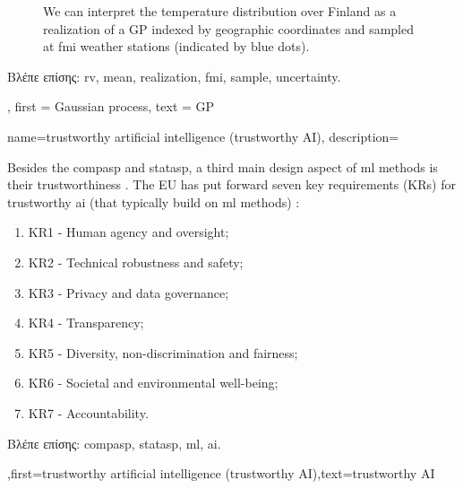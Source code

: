 {{\begin{figure}[H]
\begin{center}
\vspace*{-15mm}
\end{center}
\caption{We can interpret the temperature distribution over Finland as a \gls{realization} 
	of a GP indexed by geographic coordinates and sampled at \gls{fmi} weather stations (indicated by 
	blue dots). \label{fig_gp_FMI}}
\end{figure}
\foreignlanguage{greek}{Βλέπε επίσης:} \gls{rv}, \gls{mean}, \gls{realization}, \gls{fmi}, \gls{sample}, \gls{uncertainty}. }, 
first = {Gaussian process}, 
text = {GP}
}

{name={trustworthy artificial intelligence (trustworthy AI)},
	description={Besides the \gls{compasp} and \gls{statasp}, a third main design aspect of 
		\gls{ml} methods is their trustworthiness \cite{pfau2024engineeringtrustworthyaideveloper}. 
		The EU has put forward seven key requirements (KRs) for trustworthy 
		\gls{ai} (that typically build on \gls{ml} methods) \cite{ALTAIEU}: 
		\begin{enumerate}[label=\arabic*)]
			\item KR1 - Human agency and oversight;
			\item KR2 - Technical robustness and safety;
			\item KR3 - Privacy and data governance;
			\item KR4 - Transparency;
			\item KR5 - Diversity, non-discrimination and fairness; 
			\item KR6 - Societal and environmental well-being;
			\item KR7 - Accountability. 
		\end{enumerate}
	\foreignlanguage{greek}{Βλέπε επίσης:} \gls{compasp}, \gls{statasp}, \gls{ml}, \gls{ai}.
	},first={trustworthy artificial intelligence (trustworthy AI)},text={trustworthy AI}}

